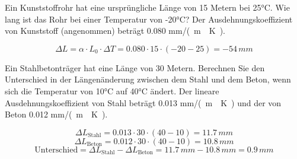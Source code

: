\begin{questions}
\question Ein Kunststoffrohr hat eine ursprüngliche Länge von 15 Metern bei 25°C. Wie lang ist das Rohr bei einer Temperatur von -20°C? Der Ausdehnungskoeffizient von Kunststoff (angenommen) beträgt \num{0.080} \si{mm/(m\cdot K)}.
\begin{solution}
    \[ \Delta L = \alpha \cdot L_0 \cdot \Delta T = \num{0.080} \cdot 15 \cdot (-20 - 25) = \num{-54} \, \si{mm} \]
\end{solution}



\question Ein Stahlbetonträger hat eine Länge von 30 Metern. Berechnen Sie den Unterschied in der Längenänderung zwischen dem Stahl und dem Beton, wenn sich die Temperatur von 10°C auf 40°C ändert. Der lineare Ausdehnungskoeffizient von Stahl beträgt \num{0.013} \si{mm/(m\cdot K)} und der von Beton \num{0.012} \si{mm/(m\cdot K)}.
\begin{solution}
    \[ \Delta L_{\text{Stahl}} = \num{0.013} \cdot 30 \cdot (40 - 10) = \num{11.7} \, \si{mm} \]
    \[ \Delta L_{\text{Beton}} = \num{0.012} \cdot 30 \cdot (40 - 10) = \num{10.8} \, \si{mm} \]
    \[ \text{Unterschied} = \Delta L_{\text{Stahl}} - \Delta L_{\text{Beton}} = \num{11.7} \, \si{mm} - \num{10.8} \, \si{mm} = \num{0.9} \, \si{mm} \]
\end{solution}

\end{questions}

